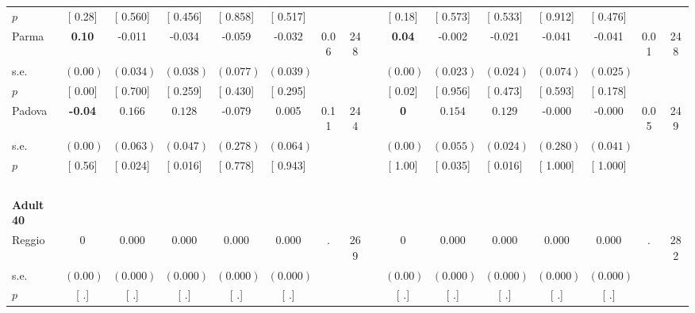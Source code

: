 \begin{longtable}{L{8em} c c c c c c c p{1em} c c c c c c c}
\quad \quad \quad \quad $ p$ & [     0.28] & [    0.560] & [    0.456] & [    0.858] & [    0.517] & & & & [     0.18] & [    0.573] & [    0.533] & [    0.912] & [    0.476] & &  \\[1em]
\quad \quad \quad Parma& \textbf{     0.10} &    -0.011 &    -0.034 &    -0.059 &    -0.032 &      0.06 &       248 & & \textbf{     0.04} &    -0.002 &    -0.021 &    -0.041 &    -0.041 &      0.01 &       248  \\*
\quad \quad \quad \quad s.e.& $ (     0.00)$ & $ (    0.034)$ & $ (    0.038)$ & $ (    0.077)$ & $ (    0.039)$ & & & & $ (     0.00)$ & $ (    0.023)$ & $ (    0.024)$ & $ (    0.074)$ & $ (    0.025)$ & &  \\*
\quad \quad \quad \quad $ p$ & [     0.00] & [    0.700] & [    0.259] & [    0.430] & [    0.295] & & & & [     0.02] & [    0.956] & [    0.473] & [    0.593] & [    0.178] & &  \\[1em]
\quad \quad \quad Padova& \textbf{    -0.04} & $ \mathbf{    0.166}$ & $ \mathbf{    0.128}$ &    -0.079 &     0.005 &      0.11 &       244 & & \textbf{0} & $ \mathbf{    0.154}$ & $ \mathbf{    0.129}$ &    -0.000 &    -0.000 &      0.05 &       249  \\*
\quad \quad \quad \quad s.e.& $ (     0.00)$ & $ (    0.063)$ & $ (    0.047)$ & $ (    0.278)$ & $ (    0.064)$ & & & & $ (     0.00)$ & $ (    0.055)$ & $ (    0.024)$ & $ (    0.280)$ & $ (    0.041)$ & &  \\*
\quad \quad \quad \quad $ p$ & [     0.56] & [    0.024] & [    0.016] & [    0.778] & [    0.943] & & & & [     1.00] & [    0.035] & [    0.016] & [    1.000] & [    1.000] & &  \\[1em]
~\\[1em]
\quad \quad \textbf{Adult 40} & & & & & & & & & & & & & & & \\* 
\quad \quad \quad Reggio& 0 &     0.000 &     0.000 &     0.000 &     0.000 &         . &       269 & & 0 &     0.000 &     0.000 &     0.000 &     0.000 &         . &       282  \\*
\quad \quad \quad \quad s.e.& $ (     0.00)$ & $ (    0.000)$ & $ (    0.000)$ & $ (    0.000)$ & $ (    0.000)$ & & & & $ (     0.00)$ & $ (    0.000)$ & $ (    0.000)$ & $ (    0.000)$ & $ (    0.000)$ & &  \\*
\quad \quad \quad \quad $ p$ & [        .] & [        .] & [        .] & [        .] & [        .] & & & & [        .] & [        .] & [        .] & [        .] & [        .] & &  \\[1em]

\end{longtable}
